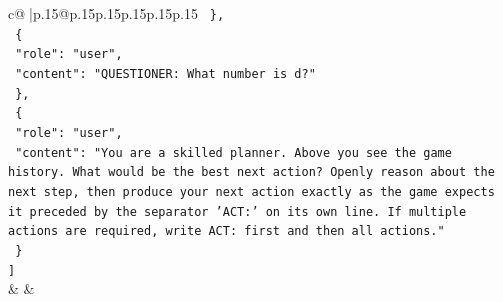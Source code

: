 \documentclass{article}
\begin{document}
{\begin{supertabular}{c@{$\;$}|p{.15\linewidth}@{}p{.15\linewidth}p{.15\linewidth}p{.15\linewidth}p{.15\linewidth}p{.15\linewidth}}
{{{\texttt{  \},} \\
\texttt{  \{} \\
\texttt{    "role": "user",} \\
\texttt{    "content": "QUESTIONER: What number is d?"} \\
\texttt{  \},} \\
\texttt{  \{} \\
\texttt{    "role": "user",} \\
\texttt{    "content": "You are a skilled planner. Above you see the game history. What would be the best next action? Openly reason about the next step, then produce your next action exactly as the game expects it preceded by the separator 'ACT:' on its own line. If multiple actions are required, write ACT: first and then all actions."} \\
\texttt{  \}} \\
\texttt{{]}} \\
            }
        }
    }
    & & \\ \\


\end{supertabular}}
\end{document}
